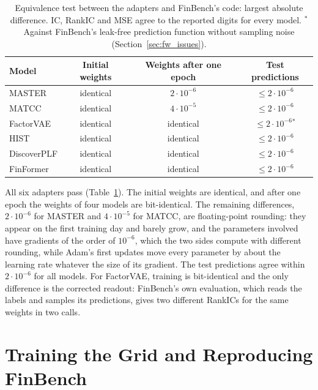 \begin{table}[htbp]
    \centering
    \small
    \begin{tabular}{@{}lccc@{}}
        \toprule
        \textbf{Model} & \textbf{Initial weights} & \textbf{Weights after one epoch} & \textbf{Test predictions} \\
        \midrule
        MASTER & identical & $2 \cdot 10^{-6}$ & $\leq 2 \cdot 10^{-6}$ \\
        MATCC & identical & $4 \cdot 10^{-5}$ & $\leq 2 \cdot 10^{-6}$ \\
        FactorVAE & identical & identical & $\leq 2 \cdot 10^{-6}$$^\ast$ \\
        HIST & identical & identical & $\leq 2 \cdot 10^{-6}$ \\
        DiscoverPLF & identical & identical & $\leq 2 \cdot 10^{-6}$ \\
        FinFormer & identical & identical & $\leq 2 \cdot 10^{-6}$ \\
        \bottomrule
    \end{tabular}
    \caption{Equivalence test between the adapters and FinBench's code: largest absolute difference. IC, RankIC and MSE agree to the reported digits for every model. $^\ast$Against FinBench's leak-free prediction function without sampling noise (Section~\ref{sec:fw_issues}).}
    \label{tab:fw_equivalence}
\end{table}

All six adapters pass (Table~\ref{tab:fw_equivalence}). The initial weights are identical, and after one epoch the weights of four models are bit-identical. The remaining differences, $2 \cdot 10^{-6}$ for MASTER and $4 \cdot 10^{-5}$ for MATCC, are floating-point rounding: they appear on the first training day and barely grow, and the parameters involved have gradients of the order of $10^{-6}$, which the two sides compute with different rounding, while Adam's first updates move every parameter by about the learning rate whatever the size of its gradient. The test predictions agree within $2 \cdot 10^{-6}$ for all models. For FactorVAE, training is bit-identical and the only difference is the corrected readout: FinBench's own evaluation, which reads the labels and samples its predictions, gives two different RankICs for the same weights in two calls.

\section{Training the Grid and Reproducing FinBench}
\label{sec:fw_reproduction}

